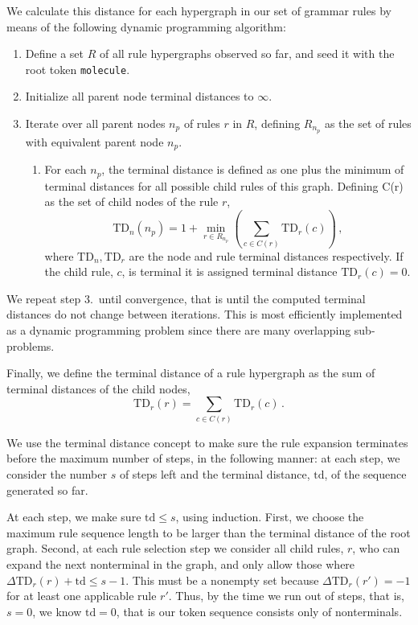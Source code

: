 \documentclass{article}
\newcommand{\TD}{\ensuremath{\text{TD}}}
\begin{document}
We calculate this distance for each hypergraph in our set of grammar rules by means of the following dynamic programming algorithm: 
\begin{enumerate}
	\item Define a set $R$ of all rule hypergraphs observed so far, and seed it with the root token \verb+molecule+. 
    \item Initialize all parent node terminal distances to $\infty$.
    \item Iterate over all parent nodes $n_p$ of rules $r$ in $R$, defining $R_{n_p}$ as the set of rules with equivalent parent node $n_p$.
	\begin{enumerate}
        \item For each $n_p$, the terminal distance is defined as one plus the minimum of terminal distances for all possible child rules of this graph. Defining C(r) as the set of child nodes of the rule $r$,
            \begin{equation}\label{eq:td}
                \TD_n(n_p) = 1 + \min_{r \in R_{n_p}}\left(\sum_{c \in C(r)} \TD_r(c) \right)\,,
            \end{equation}
            where $\TD_n, \TD_r$ are the node and rule terminal distances respectively. If the child rule, $c$, is terminal it is assigned terminal distance $\TD_r(c) = 0$.
	\end{enumerate}
\end{enumerate}
We repeat step 3.~until convergence, that is until the computed terminal distances do not change between iterations. This is most efficiently implemented as a dynamic programming problem since there are many overlapping sub-problems.

Finally, we define the terminal distance of a rule hypergraph as the sum of terminal distances of the child nodes,
\begin{equation}
    \TD_r(r) = \sum_{c \in C(r)} \TD_r(c)\,.
\end{equation}

We use the terminal distance concept to make sure the rule expansion terminates before the maximum number of steps, in the following manner: at each step, we consider the number $s$ of steps left and the terminal distance, $\text{td}$, of the sequence generated so far. 

At each step, we make sure $\text{td}\le s$, using induction. First, we choose the maximum rule sequence length to be larger than the terminal distance of the root graph. Second, at each rule selection step we consider all child rules, $r$, who can expand the next nonterminal in the graph, and only allow those where $\Delta \TD_r(r) + \text{td} \le s-1$. This must be a nonempty set because $\Delta \TD_r(r') = -1$ for at least one applicable rule $r'$. Thus, by the time we run out of steps, that is, $s=0$, we know $\text{td}=0$, that is our token sequence consists only of nonterminals. 
\end{document}
